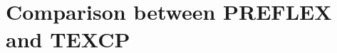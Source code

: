 \section{Comparison between PREFLEX and TEXCP}
\begin{comment}

{\bf Balancing by path utilization}
\\In this section we consider a simplified version of TEXCP (the same as in 5.1.1) that balances path utilization but doesn't activate TEXCP congestion management measures and only balance the path utilization. As expected (figure \ref{fig:st-util}), the modified version do very well in equalizing the path utilization, achieving very quickly to changes in network traffic state while keeping a stable behaviour. 

However, by looking at the drop rate in bottlenecks (figure \ref{fig:st-drop}) we observe that it is not equal on the different links. This observation, have a meaningful explanation behind. The high drop rate on the like is compensated by a higher load (received bytes over the capacity) so the utilization is equal on the three links. This means that using only this measure for balancing the load we risk to drive the network to a suboptimal state. The other observation is about the loss level that ingress routers see using LEX codepoint (figure \ref{fig:st-loss1}). All the three interfaces, which correspond to the links, have the same level. This is an expected result since TEXP use FLARE which doesn't guarantee that retransmissions follow the same path as the original packet. This have another result is that within few RTTs, TCP routines using different paths experience the congestion of each of them and hence they adapt their transmission rate to a combination of loss rate in each path that could be estimated as:

\begin{equation}
\rho = \sum_{i} x_{i}\cdot \rho_{i} 
\end{equation}

where, $\rho_{i}$ and $x_{i}$ are respectively the loss rate and the probability to take path $i$. But we should keep in mind that such high levels of path utilization aren't frequent in intra-domain TE, since not all the flows are elastic as it is the case in our scenario. For such cases, TEXCP defines a feedback mechanism to control congestion.

\begin{figure}[h]
\begin{center}


\end{comment}
